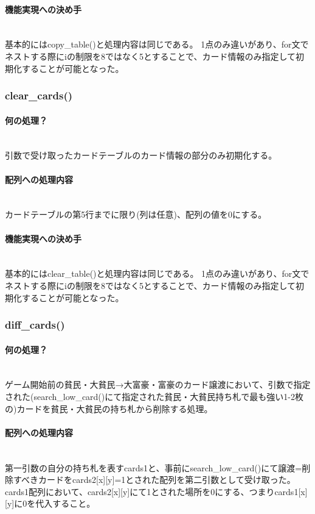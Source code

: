 \documentclass[11pt,a4paper, uplatex]{jsarticle}
\begin{document}
\paragraph{機能実現への決め手}\mbox{}\\
基本的にはcopy\_table()と処理内容は同じである。
1点のみ違いがあり、for文でネストする際にiの制限を8ではなく5とすることで、カード情報のみ指定して初期化することが可能となった。
%
\subsubsection{clear\_cards()}
\paragraph{何の処理？}\mbox{}\\
引数で受け取ったカードテーブルのカード情報の部分のみ初期化する。
\paragraph{配列への処理内容}\mbox{}\\
カードテーブルの第5行までに限り(列は任意)、配列の値を0にする。
\paragraph{機能実現への決め手}\mbox{}\\
基本的にはclear\_table()と処理内容は同じである。
1点のみ違いがあり、for文でネストする際にiの制限を8ではなく5とすることで、カード情報のみ指定して初期化することが可能となった。
%
\subsubsection{diff\_cards()}
\paragraph{何の処理？}\mbox{}\\
ゲーム開始前の貧民・大貧民→大富豪・富豪のカード譲渡において、引数で指定された(search\_low\_card()にて指定された貧民・大貧民持ち札で最も強い1-2枚の)カードを貧民・大貧民の持ち札から削除する処理。
\paragraph{配列への処理内容}\mbox{}\\
第一引数の自分の持ち札を表すcards1と、事前にsearch\_low\_card()にて譲渡=削除すべきカードをcards2[x][y]=1とされた配列を第二引数として受け取った。cards1配列において、cards2[x][y]にて1とされた場所を0にする、つまりcards1[x][y]に0を代入すること。
\end{document}
